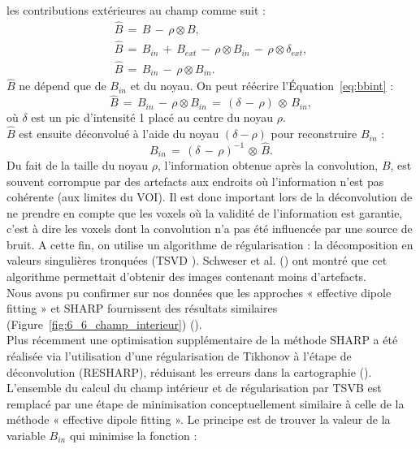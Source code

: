 {les contributions extérieures au champ comme suit :
\begin{eqnarray}
\hat{B}\,=\,B\,-\,\rho\otimes B,\\
\hat{B}\,=\,B_{in}\,+\,B_{ext}\,-\,\rho\otimes B_{in}\,-\,\rho\otimes\delta_{ext},\\
\hat{B}\,=\,B_{in}\,-\,\rho\otimes B_{in}.\label{eq:bbint}
\end{eqnarray}
$\hat{B}$ ne dépend que de $B_{in}$ et du noyau. On peut réécrire l’Équation~\ref{eq:bbint} :
\begin{equation}
\hat{B}\,=\,B_{in}\,-\,\rho\otimes B_{in}\,=\,(\delta\,-\,\rho)\,\otimes\,B_{in},
\end{equation}
où $\delta$ est un pic d’intensité 1 placé au centre du noyau $\rho$.\\
$\hat{B}$ est ensuite déconvolué à l’aide du noyau $(\delta-\rho)$ pour reconstruire $B_{in}$ :
\begin{equation}
B_{in}\,=\,(\delta\,-\,\rho)^{-1}\,\otimes\,\hat{B}.
\end{equation}
Du fait de la taille du noyau $\rho$, l'information obtenue après la convolution, $B$, est souvent corrompue
par des artefacts aux endroits où l'information n'est pas cohérente (aux limites du VOI). Il est donc
important lors de la déconvolution de ne prendre en compte que les voxels où la validité de
l'information est garantie, c'est à dire les voxels dont la convolution n'a pas été influencée par une
source de bruit. A cette fin, on utilise un algorithme de régularisation : la décomposition en valeurs
singulières tronquées (TSVD \cite{Bertero2006}). Schweser et al. (\cite{Schweser2011}) ont montré que cet algorithme permettait d'obtenir
des images contenant moins d'artefacts.\\
Nous avons pu confirmer sur nos données que les approches « effective dipole fitting » et
SHARP fournissent des résultats similaires (Figure~\ref{fig:6_6_champ_interieur}) (\cite{Schweser2011}).\\
Plus récemment une optimisation supplémentaire de la méthode SHARP a été réalisée via
l’utilisation d’une régularisation de Tikhonov à l’étape de déconvolution (RESHARP), réduisant les
erreurs dans la cartographie (\cite{Sun2014}). L’ensemble du calcul du champ intérieur et de régularisation par
TSVB est remplacé par une étape de minimisation conceptuellement similaire à celle de la méthode
« effective dipole fitting ». Le principe est de trouver la valeur de la variable $B_{in}$ qui minimise la
fonction :
\begin{equation}

\end{equation}}
